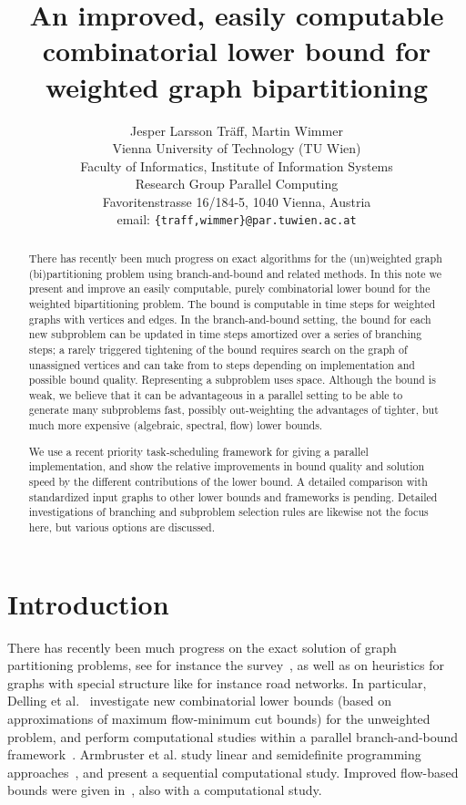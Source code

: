 \documentclass[a4paper,11pt]{article}
\title{An improved, easily computable combinatorial lower bound
  for weighted graph bipartitioning}
\author{Jesper Larsson Tr\"aff, Martin Wimmer\\
Vienna University of Technology (TU Wien)\\
Faculty of Informatics, Institute of Information Systems\\ 
Research Group Parallel Computing\\
Favoritenstrasse 16/184-5, 1040 Vienna, Austria\\
email: \texttt{\{traff,wimmer\}@par.tuwien.ac.at}
}
\begin{document}
\maketitle

\begin{abstract}
There has recently been much progress on exact algorithms for the
(un)weighted graph (bi)partitioning problem using branch-and-bound and
related methods.  In this note we present and improve an easily
computable, purely combinatorial lower bound for the weighted
bipartitioning problem. The bound is computable in  time
steps for weighted graphs with  vertices and  edges. In the
branch-and-bound setting, the bound for each new subproblem can be
updated in  time steps amortized over a series of 
branching steps; a rarely triggered tightening of the bound requires
search on the graph of unassigned vertices and can take from 
to  steps depending on implementation and possible
bound quality. Representing a subproblem uses  space. Although
the bound is weak, we believe that it can be advantageous in a
parallel setting to be able to generate many subproblems fast,
possibly out-weighting the advantages of tighter, but much more
expensive (algebraic, spectral, flow) lower bounds.

We use a recent priority task-scheduling framework for giving a
parallel implementation, and show the relative improvements in bound
quality and solution speed by the different contributions of the lower
bound. A detailed comparison with standardized input graphs to other
lower bounds and frameworks is pending. Detailed investigations of
branching and subproblem selection rules are likewise not the focus
here, but various options are discussed.
\end{abstract}

\section{Introduction}

There has recently been much progress on the exact solution of graph
partitioning problems, see for instance the
survey~\cite{MeyerhenkeSanders13}, as well as on heuristics for graphs
with special structure like for instance road networks.  In
particular, Delling et
al.~\cite{DellingGoldbergRazenshteynWerneck11,DellingGoldbergRazenshteynWerneck12,DellingWerneck12}
investigate new combinatorial lower bounds (based on approximations of
maximum flow-minimum cut bounds) for the unweighted problem, and
perform computational studies within a parallel branch-and-bound
framework~\cite{BudiuDellingWerneck11}. Armbruster et al. study linear
and semidefinite programming
approaches~\cite{ArmbrusterFugenschuhHelmbergMartin12}, and present a
sequential computational study. Improved flow-based bounds were given
in~\cite{Sensen01}, also with a computational study.
\end{document}
